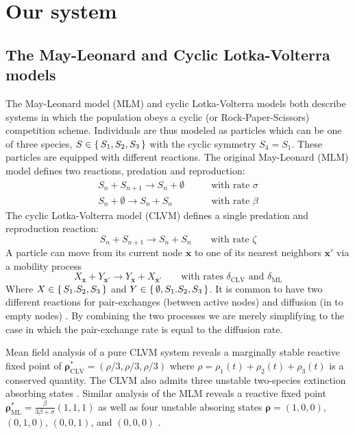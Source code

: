 \documentclass[12pt]{article}
\begin{document}
\section{Our system}%
\label{sec:our_system}


\subsection{The May-Leonard and Cyclic Lotka-Volterra models}%
\label{sub:models}

The May-Leonard model (MLM) and cyclic Lotka-Volterra models both describe systems 
in which the population obeys a cyclic (or Rock-Paper-Scissors) competition scheme. 
Individuals are thus modeled as particles which can be one of three species, 
$ S \in \set{S_1, S_2, S_3} $ with the cyclic symmetry $ S_4 = S_1 $. These particles
are equipped with different reactions.
The original May-Leonard (MLM) model defines two reactions, predation and reproduction:
\begin{align}
    \label{eq:mlpred} S_n + S_{n+1} \to S_n + \emptyset \qquad &\text{with rate } \sigma\\
    \label{eq:mlrep} S_n + \emptyset \to S_n + S_n \qquad &\text{with rate } \beta
\end{align}
The cyclic Lotka-Volterra model (CLVM) defines a single predation and reproduction reaction:
\begin{equation}
    \label{eq:rpspred} S_n + S_{n+1} \to S_n + S_n \qquad \text{with rate } \zeta
\end{equation}
A particle can move from its current node $ \bm{x} $ to one of its nearest neighbors
$ \bm{x}'$ via a mobility process
\begin{equation}
    \label{eq:mob} X_{\bm{x}} + Y_{\bm{x}'} \to Y_{\bm{x}} + X_{\bm{x}'} \qquad \text{with rates } \delta_{\mathrm{CLV}} \text{ and } \delta_{\mathrm{ML}}
\end{equation}
Where $ X \in \set{S_1. S_2, S_3} $ and $ Y \in \set{\emptyset, S_1. S_2, S_3} $. It is common to have two different reactions
for pair-exchanges (between active nodes) and diffusion (in to empty nodes) \cite{dobromasyletal}. By combining the two processes 
we are merely simplifying to the case in which the pair-exchange rate is equal to the diffusion rate.

Mean field analysis of a pure CLVM system reveals a marginally stable reactive fixed point of 
$ \bm{\rho}_{\mathrm{CLV}}^* = (\rho/3, \rho/3, \rho/3) $ where 
$ \rho = \rho_1(t) + \rho_2(t) + \rho_3(t) $ is a conserved quantity\cite{HeTauberZia}.
The CLVM also admits three unstable two-species extinction absorbing states \cite{HeTauberZia}.
Similar analysis of the MLM reveals a reactive fixed point $ \bm{\rho}_{\mathrm{ML}}^* = \frac{\beta}{3\beta + \sigma}(1,1,1) $ 
as well as four unstable absoring states $ \bm{\rho} = (1,0,0) $, $ (0,1,0) $, $ (0,0,1) $, and
$ (0,0,0) $ \cite{HeMobiliaTauber}. 
\end{document}
